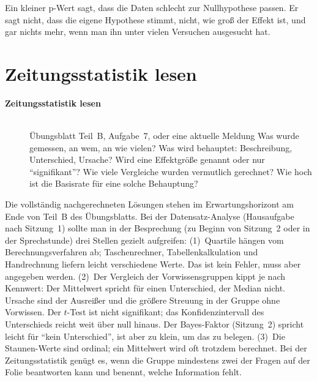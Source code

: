 \begin{merkbox}
Ein kleiner p-Wert sagt, dass die Daten schlecht zur Nullhypothese
passen. Er sagt nicht, dass die eigene Hypothese stimmt, nicht, wie groß
der Effekt ist, und gar nichts mehr, wenn man ihn unter vielen Versuchen
ausgesucht hat.
\end{merkbox}
\os{\newpage}

\section{Zeitungsstatistik lesen}
\begin{description}
\item[{\rot\bf Zeitungsstatistik lesen}]~\\[-\lblskip]
\bi
  \ite Übungsblatt Teil~B, Aufgabe~7, oder eine aktuelle Meldung
  \ite Was wurde gemessen, an wem, an wie vielen?
  \ite Was wird behauptet: Beschreibung, Unterschied, Ursache?
  \ite Wird eine Effektgröße genannt oder nur \enquote{signifikant}?
  \ite Wie viele Vergleiche wurden vermutlich gerechnet?
  \ite Wie hoch ist die Basisrate für eine solche Behauptung?
\ei
\os{\newpage}
\end{description}

\begin{lehrhinweis}
Die vollständig nachgerechneten Lösungen stehen im Erwartungshorizont am
Ende von Teil~B des Übungsblatts. Bei der Datensatz-Analyse (Hausaufgabe
nach Sitzung~1) sollte man in der Besprechung (zu Beginn von Sitzung~2
oder in der Sprechstunde) drei Stellen gezielt aufgreifen:
(1)~Quartile hängen vom Berechnungsverfahren ab; Taschenrechner,
Tabellenkalkulation und Handrechnung liefern leicht verschiedene Werte.
Das ist kein Fehler, muss aber angegeben werden. (2)~Der Vergleich der
Vorwissensgruppen kippt je nach Kennwert: Der Mittelwert spricht für einen
Unterschied, der Median nicht. Ursache sind der Ausreißer und die größere
Streuung in der Gruppe ohne Vorwissen. Der $t$-Test ist nicht
signifikant; das Konfidenzintervall des Unterschieds reicht weit über
null hinaus. Der Bayes-Faktor (Sitzung~2) spricht leicht für \enquote{kein
Unterschied}, ist aber zu klein, um das zu belegen. (3)~Die Staunen-Werte
sind ordinal; ein Mittelwert wird oft trotzdem berechnet. Bei der
Zeitungsstatistik genügt es, wenn die Gruppe mindestens zwei der Fragen
auf der Folie beantworten kann und benennt, welche Information fehlt.
\end{lehrhinweis}

